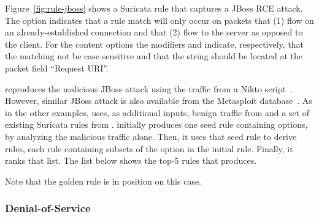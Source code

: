 \documentclass[sigconf,review, anonymous]{acmart}
\begin{document}

Figure~\ref{fig:rule-jboss} shows a Suricata rule that captures a
JBoss RCE attack.  The option 
indicates that a rule match will only occur on packets that (1) flow
on an already-established connection and that (2) flow to the server
as opposed to the client. For the content options the modifiers
 and  indicate, respectively, that
the matching not be case sensitive and that the string should be
located at the packet field ``Request URI''. 

\tname{} reproduces the malicious JBoss attack using the traffic from
a Nikto script~\cite{nikto}. However, similar JBoss attack is also
available from the Metasploit database~\cite{metasploit}. As in the
other examples, \tname{} uses, as additional inputs, benign traffic
from  and a set of existing Suricata rules from
. \tname{} initially produces one seed rule containing
 options, by analyzing the malicious traffic alone. Then, it
uses that seed rule to derive  rules, each rule containing
subsets of the option in the initial rule. Finally, it ranks that
list. The list below shows the top-5 rules that \tname{}
produces.


Note that the golden rule is in position  on this
case. 

\subsubsection{Denial-of-Service}
\label{sec:dos}

\end{document}
